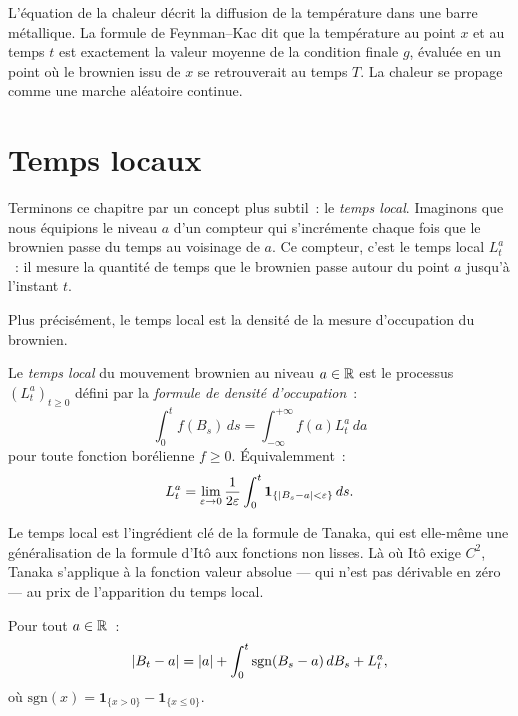 L'\'equation de la chaleur d\'ecrit la diffusion de la temp\'erature dans une
barre m\'etallique. La formule de Feynman--Kac dit que la temp\'erature au
point $x$ et au temps $t$ est exactement la valeur moyenne de la condition
finale $g$, \'evalu\'ee en un point o\`u le brownien issu de $x$ se
retrouverait au temps $T$. La chaleur se propage comme une marche
al\'eatoire continue.

\section{Temps locaux}

Terminons ce chapitre par un concept plus subtil~: le \emph{temps local}.
Imaginons que nous \'equipions le niveau $a$ d'un compteur qui s'incr\'emente
chaque fois que le brownien \og passe du temps\fg{} au voisinage de $a$. Ce
compteur, c'est le temps local $L_t^a$~: il mesure la quantit\'e de temps que
le brownien passe autour du point $a$ jusqu'\`a l'instant $t$.

Plus pr\'ecis\'ement, le temps local est la densit\'e de la mesure d'occupation
du brownien.

\begin{definition}
Le \emph{temps local} du mouvement brownien au niveau $a \in \mathbb{R}$ est le processus
$(L_t^a)_{t \geq 0}$ d\'efini par la \emph{formule de densit\'e d'occupation}~:
\[
  \int_0^t f(B_s) \, ds = \int_{-\infty}^{+\infty} f(a) L_t^a \, da
\]
pour toute fonction bor\'elienne $f \geq 0$. \'Equivalemment~:
\[
  L_t^a = \lim_{\varepsilon \to 0} \frac{1}{2\varepsilon}
  \int_0^t \mathbf{1}_{\{\left| B_s - a \right| < \varepsilon\}} \, ds.
\]
\end{definition}

Le temps local est l'ingr\'edient cl\'e de la formule de Tanaka, qui est
elle-m\^eme une g\'en\'eralisation de la formule d'It\^o aux fonctions non
lisses. L\`a o\`u It\^o exige $C^2$, Tanaka s'applique \`a la fonction valeur
absolue --- qui n'est pas d\'erivable en z\'ero --- au prix de l'apparition
du temps local.

\begin{theoreme}
\label{thm:tanaka}
Pour tout $a \in \mathbb{R}$~:
\[
  \left| B_t - a \right| = \left| a \right| + \int_0^t \text{sgn}(B_s - a) \, dB_s + L_t^a,
\]
o\`u $\text{sgn}(x) = \mathbf{1}_{\{x > 0\}} - \mathbf{1}_{\{x \leq 0\}}$.
\end{theoreme}

